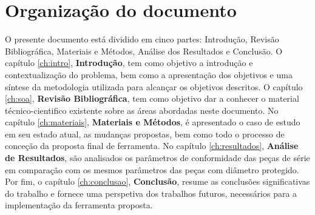 \section{Organização do documento} \label{s:intro_organizacao}
O presente documento está dividido em cinco partes: Introdução, Revisão Bibliográfica, Materiais e Métodos, Análise dos Resultados e Conclusão.
\vspace{2mm}
\newline
O capítulo \ref{ch:intro}, \textbf{Introdução}, tem como objetivo a introdução e contextualização do problema, bem como a apresentação dos objetivos e uma síntese da metodologia utilizada para alcançar os objetivos descritos. 
\newline
O capítulo \ref{ch:soa}, \textbf{Revisão Bibliográfica}, tem como objetivo dar a conhecer o material técnico-cientifico existente sobre as áreas abordadas neste documento.
\newline
No capítulo \ref{ch:materiais}, \textbf{Materiais e Métodos}, é apresentado o caso de estudo em seu estado atual, as mudanças propostas, bem como todo o processo de conceção da proposta final de ferramenta.
\newline
No capítulo \ref{ch:resultados}, \textbf{Análise de Resultados}, são analisados os parâmetros de conformidade das peças de série em comparação com os mesmos parâmetros das peças com diâmetro protegido.
\newline
Por fim, o capítulo \ref{ch:conclusao}, \textbf{Conclusão}, resume as conclusões significativas do trabalho e fornece uma perspetiva dos trabalhos futuros, necessários para a implementação da ferramenta proposta.

